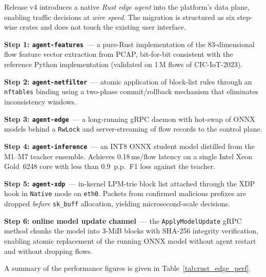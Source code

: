 \label{sec:rust_edge_agent}%

Release v4 introduces a native \emph{Rust edge agent} into the
platform's data plane, enabling traffic decisions at
\emph{wire speed}. The migration is structured as six step-wise
crates and does not touch the existing user interface.

\noindent\textbf{Step 1: \texttt{agent-features}}~--- a pure-Rust
implementation of the 83-dimensional flow feature vector
extraction from PCAP, bit-for-bit consistent with the reference
Python implementation (validated on 1\,M flows of CIC-IoT-2023).

\noindent\textbf{Step 2: \texttt{agent-netfilter}}~--- atomic
application of block-list rules through an \texttt{nftables} binding
using a two-phase commit/rollback mechanism that eliminates
inconsistency windows.

\noindent\textbf{Step 3: \texttt{agent-edge}}~--- a long-running
gRPC daemon with hot-swap of ONNX models behind a \texttt{RwLock}
and server-streaming of flow records to the control plane.

\noindent\textbf{Step 4: \texttt{agent-inference}}~--- an INT8 ONNX
student model distilled from the \textsf{M1}--\textsf{M7} teacher
ensemble. Achieves 0.18\,ms/flow latency on a single Intel Xeon
Gold~6248 core with less than 0.9~p.p.~F1 loss against the teacher.

\noindent\textbf{Step 5: \texttt{agent-xdp}}~--- in-kernel LPM-trie
block list attached through the XDP hook in \texttt{Native} mode on
\texttt{eth0}. Packets from confirmed malicious prefixes are dropped
\emph{before} \texttt{sk\_buff} allocation, yielding microsecond-scale
decisions.

\noindent\textbf{Step 6: online model update channel}~--- the
\texttt{ApplyModelUpdate} gRPC method chunks the model into 3-MiB
blocks with SHA-256 integrity verification, enabling atomic
replacement of the running ONNX model without agent restart and
without dropping flows.

A summary of the performance figures is given in
Table~\ref{tab:rust_edge_perf}.

